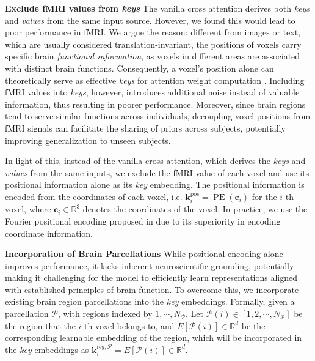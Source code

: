 \noindent\textbf{Exclude fMRI values from \textit{keys}}
The vanilla cross attention \citep{zhu2020deformable,vaswani2017attention} derives both \textit{keys} and \textit{values} from the same input source. However, we found this would lead to poor performance in fMRI. We argue the reason: different from images or text, which are usually considered translation-invariant, the positions of voxels carry specific brain \textit{functional information}, as voxels in different areas are associated with distinct brain functions. Consequently, a voxel's position alone can theoretically serve as effective \textit{keys} for attention weight computation \citep{mcmanus2002right,zhang2023abnormal,liu2024relationships}. Including fMRI values into \textit{keys}, however, introduces additional noise instead of valuable information, thus resulting in poorer performance. Moreover, since brain regions tend to serve similar functions across individuals, decoupling voxel positions from fMRI signals can facilitate the sharing of priors across subjects, potentially improving generalization to unseen subjects.

In light of this, instead of the vanilla cross attention, which derives the \textit{keys} and \textit{values} from the same inputs, we exclude the fMRI value of each voxel and use its positional information alone as its \textit{key} embedding. The positional information is encoded from the coordinates of each voxel, i.e. $\boldsymbol{k}_i^{\text{pos}} = \operatorname{PE}(\boldsymbol{c}_i)$ for the $i$-th voxel, where $\boldsymbol{c}_i \in \mathbb{R}^3$ denotes the coordinates of the voxel. In practice, we use the Fourier positional encoding proposed in \cite{tancik2020fourier} due to its superiority in encoding coordinate information.

\noindent\textbf{Incorporation of Brain Parcellations}
While positional encoding alone improves performance, it lacks inherent neuroscientific grounding, potentially making it challenging for the model to efficiently learn representations aligned with established principles of brain function. To overcome this, we incorporate existing brain region parcellations \citep{glasser2016multi,rolls2020automated} into the \textit{key} embeddings. Formally, given a parcellation $\mathcal{P}$, with regions indexed by $1, \cdots, N_\mathcal{P}$. Let $\mathcal{P}(i) \in [1, 2, \cdots, N_\mathcal{P}]$ be the region that the $i$-th voxel belongs to, and $E[\mathcal{P}(i)] \in \mathbb{R}^d$ be the corresponding learnable embedding of the region, which will be incorporated in the \textit{key} embeddings as $\boldsymbol{k}_i^{\text{reg}, \mathcal{P}} = E[\mathcal{P}(i)] \in \mathbb{R}^d$.

